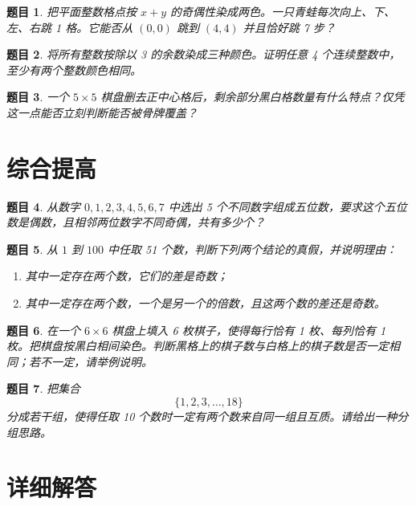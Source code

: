 \documentclass[11pt,a4paper,fontset=fandol]{ctexart}
\theoremstyle{formalexample}
\newtheorem{exercise}{题目}[section]
\begin{document}
\begin{exercise}
把平面整数格点按 $x+y$ 的奇偶性染成两色。一只青蛙每次向上、下、左、右跳 1 格。它能否从 $(0,0)$ 跳到 $(4,4)$ 并且恰好跳 7 步？
\end{exercise}

\begin{exercise}
将所有整数按除以 3 的余数染成三种颜色。证明任意 4 个连续整数中，至少有两个整数颜色相同。
\end{exercise}

\begin{exercise}
一个 $5\times 5$ 棋盘删去正中心格后，剩余部分黑白格数量有什么特点？仅凭这一点能否立刻判断能否被骨牌覆盖？
\end{exercise}

\section{综合提高}

\begin{exercise}
从数字 $0,1,2,3,4,5,6,7$ 中选出 5 个不同数字组成五位数，要求这个五位数是偶数，且相邻两位数字不同奇偶，共有多少个？
\end{exercise}

\begin{exercise}
从 $1$ 到 $100$ 中任取 51 个数，判断下列两个结论的真假，并说明理由：
\begin{enumerate}
  \item 其中一定存在两个数，它们的差是奇数；
  \item 其中一定存在两个数，一个是另一个的倍数，且这两个数的差还是奇数。
\end{enumerate}
\end{exercise}

\begin{exercise}
在一个 $6\times 6$ 棋盘上填入 6 枚棋子，使得每行恰有 1 枚、每列恰有 1 枚。把棋盘按黑白相间染色。判断黑格上的棋子数与白格上的棋子数是否一定相同；若不一定，请举例说明。
\end{exercise}

\begin{exercise}
把集合
\[
\{1,2,3,\ldots,18\}
\]
分成若干组，使得任取 10 个数时一定有两个数来自同一组且互质。请给出一种分组思路。
\end{exercise}

\newpage
\appendix
\section{详细解答}
\end{document}
